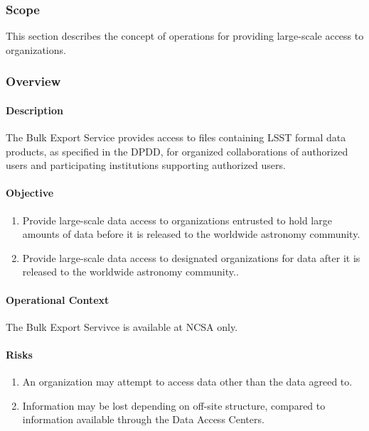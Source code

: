 \subsubsection{Scope}
This section describes the concept of operations for providing large-scale access to organizations.

\subsubsection{Overview}

\paragraph{Description}

The Bulk Export Service provides access to files containing LSST formal data products, as specified in the DPDD, for organized collaborations of authorized users and
participating institutions supporting authorized users.

\paragraph{Objective}

\begin{enumerate}

\item Provide large-scale data access to organizations entrusted to hold large
amounts of data before it is released to the worldwide astronomy community.

\item Provide large-scale data access to designated organizations for data after
it is released to the worldwide astronomy community..

\end{enumerate}

\paragraph{Operational Context}
The Bulk Export Servivce is available at NCSA only.

\paragraph{Risks}

\begin{enumerate}

\item An organization may attempt to access data other than the data agreed to.

\item Information may be lost depending on off-site structure, compared to information available through the Data Access Centers.

\end{enumerate}

